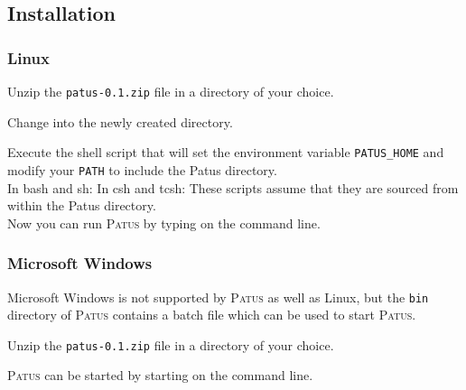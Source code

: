 \subsection{Installation}

\subsubsection{Linux}

Unzip the \texttt{patus-0.1.zip} file in a directory of your choice.

\noindent Change into the newly created directory.

\noindent Execute the shell script that will set the environment variable
\texttt{PATUS\_HOME} and modify your \texttt{PATH} to include the Patus directory.\\
In bash and sh: 
In csh and tcsh: 
These scripts assume that they are sourced from within the Patus directory.\\[2pt]

\noindent Now you can run \textsc{Patus} by typing
 on the command line.


\subsubsection{Microsoft Windows}

Microsoft Windows is not supported by \textsc{Patus} as well as Linux, but the \texttt{bin}
directory of \textsc{Patus} contains a batch file which can be used to start \textsc{Patus}.

\medskip
\noindent Unzip the \texttt{patus-0.1.zip} file in a directory of your choice.

\medskip
\noindent \textsc{Patus} can be started by starting  on the command line.
